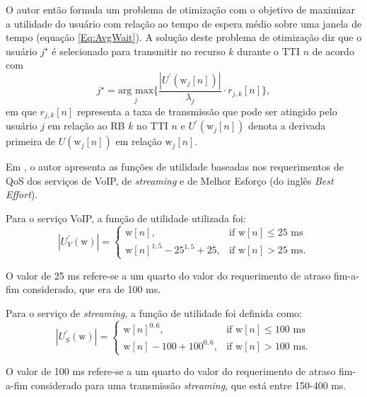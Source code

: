 O autor então formula um problema de otimização com o objetivo de maximizar a utilidade do usuário com relação ao tempo de espera médio sobre uma janela de tempo (equação \ref{Eq:AvgWait}). A solução deste problema de otimização diz que o usuário $j^{\star}$ é selecionado para transmitir no recurso $k$ durante o TTI $n$ de acordo com 
%
\begin{equation}
j^{\star} = \underset{j}{\text{arg max}}\Big\{ \frac{|U^{'}(\text{w}_j[n])|}{\lambda_j}   \cdot r_{j, k}[n] \Big \}, 
\end{equation}
%
em que $r_{j, k}[n]$ representa a taxa de transmissão que pode ser atingido pelo usuário $j$ em relação ao RB $k$ no TTI $n$ e $U^{'}(\text{w}_j[n])$ denota a derivada primeira de $U(\text{w}_j[n])$ em relação $\text{w}_j[n]$.

Em , o autor apresenta as funções de utilidade baseadas nos requerimentos de QoS dos serviços de VoIP, de \textit{streaming} e de Melhor Esforço (do inglês \textit{Best Effort}).

Para o serviço VoIP, a função de utilidade utilizada foi:
%
\begin{equation}
\label{Eq:VoIP}
\left| U^{'}_V(\text{w}) \right| = \begin{cases} 
										\text{w}[n], & \text{if  } \text{w}[n] \leq \text{25 ms} \\ 
										\text{w}[n]^{1,5} - 25^{1,5} + 25, & \text{if  } \text{w}[n] >  \text{25 ms}. 
								   \end{cases}
\end{equation}

O valor de 25 ms refere-se a um quarto do valor do requerimento de atraso fim-a-fim considerado, que era de 100 ms.

Para o serviço de \textit{streaming}, a função de utilidade foi definida como:
%
\begin{equation}
\label{Eq:Streaming}
\left| U^{'}_S(\text{w}) \right| = \begin{cases} 
										\text{w}[n]^{0,6}, & \text{if  } \text{w}[n] \leq \text{100 ms} \\ 
									    \text{w}[n] - 100 + 100^{0,6}, & \text{if  } \text{w}[n] >  \text{100 ms}. 
									\end{cases}
\end{equation}

O valor de 100 ms refere-se a um quarto do valor do requerimento de atraso fim-a-fim considerado para uma transmissão \textit{streaming}, que está entre 150-400 ms.

